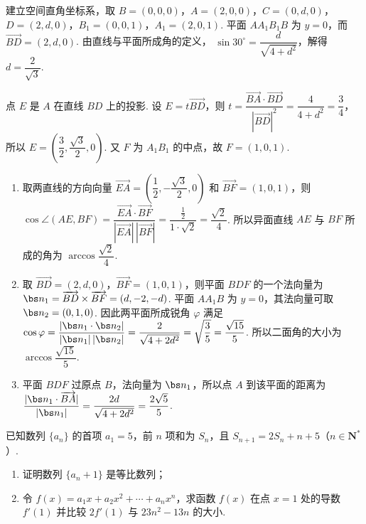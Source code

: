 \begin{solution}
建立空间直角坐标系，取
\(B=(0,0,0)\)，\(A=(2,0,0)\)，\(C=(0,d,0)\)，\(D=(2,d,0)\)，\(B_1=(0,0,1)\)，\(A_1=(2,0,1)\). 平面 \(AA_1B_1B\) 为 \(y=0\)，而 \(\overrightarrow{BD}=(2,d,0)\). 由直线与平面所成角的定义，
\(\sin30^{\circ}=\dfrac{d}{\sqrt{4+d^2}}\)，解得 \(d=\dfrac{2}{\sqrt{3}}\).

点 \(E\) 是 \(A\) 在直线 \(BD\) 上的投影. 设 \(E=t\overrightarrow{BD}\)，则
\(t=\dfrac{\overrightarrow{BA}\cdot\overrightarrow{BD}}{|\overrightarrow{BD}|^2}=\dfrac{4}{4+d^2}=\dfrac{3}{4}\)，所以 \(E=\left(\dfrac{3}{2},\dfrac{\sqrt{3}}{2},0\right)\). 又 \(F\) 为 \(A_1B_1\) 的中点，故 \(F=(1,0,1)\).

\begin{enumerate}
\item
取两直线的方向向量 \(\overrightarrow{EA}=\left(\dfrac{1}{2},-\dfrac{\sqrt{3}}{2},0\right)\) 和 \(\overrightarrow{BF}=(1,0,1)\)，则
\(\cos\angle(AE,BF)=\dfrac{\overrightarrow{EA}\cdot\overrightarrow{BF}}{|\overrightarrow{EA}|\,|\overrightarrow{BF}|}=\dfrac{\frac{1}{2}}{1\cdot\sqrt{2}}=\dfrac{\sqrt{2}}{4}\).
所以异面直线 \(AE\) 与 \(BF\) 所成的角为 \(\arccos\dfrac{\sqrt{2}}{4}\).

\item
取 \(\overrightarrow{BD}=(2,d,0)\)，\(\overrightarrow{BF}=(1,0,1)\)，则平面 \(BDF\) 的一个法向量为
\(\bs n_1=\overrightarrow{BD}\times\overrightarrow{BF}=(d,-2,-d)\). 平面 \(AA_1B\) 为 \(y=0\)，其法向量可取 \(\bs n_2=(0,1,0)\). 因此两平面所成锐角 \(\varphi\) 满足
\(\cos\varphi=\dfrac{|\bs n_1\cdot\bs n_2|}{|\bs n_1|\,|\bs n_2|}=\dfrac{2}{\sqrt{4+2d^2}}=\sqrt{\dfrac{3}{5}}=\dfrac{\sqrt{15}}{5}\).
所以二面角的大小为 \(\arccos\dfrac{\sqrt{15}}{5}\).

\item
平面 \(BDF\) 过原点 \(B\)，法向量为 \(\bs n_1\)，所以点 \(A\) 到该平面的距离为
\(\dfrac{|\bs n_1\cdot\overrightarrow{BA}|}{|\bs n_1|}=\dfrac{2d}{\sqrt{4+2d^2}}=\dfrac{2\sqrt{5}}{5}\).
\end{enumerate}
\end{solution}

\begin{problem}
已知数列 \(\{a_n\}\) 的首项 \(a_1=5\)，前 \(n\) 项和为 \(S_n\)，且 \(S_{n+1}=2S_n+n+5\)（\(n\in\mathbf{N}^{*}\)）.

\begin{enumerate}
\item 证明数列 \(\{a_n+1\}\) 是等比数列；
\item 令 \(f(x)=a_1x+a_2x^2+\cdots+a_nx^n\)，求函数 \(f(x)\) 在点 \(x=1\) 处的导数 \(f'(1)\) 并比较 \(2f'(1)\) 与 \(23n^2-13n\) 的大小.
\end{enumerate}
\end{problem}

